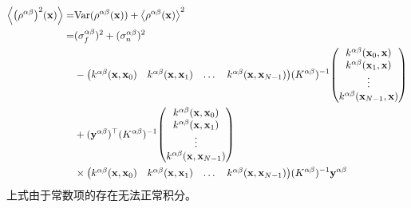 \documentclass[12pt,UTF8]{article}
\begin{document}
            \begin{align}
                \ev{\qty(\rho^{\alpha\beta})^2(\vb{x})}=&\mathrm{Var}(\rho^{\alpha\beta}(\vb{x}))+\ev{\rho^{\alpha\beta}(\vb{x})}^2 \\
                =&(\sigma_f^{\alpha\beta})^2+(\sigma_n^{\alpha\beta})^2 \nonumber \\
                &-\mqty(k^{\alpha\beta}(\vb{x},\vb{x}_{0}) & k^{\alpha\beta}(\vb{x},\vb{x}_{1}) & \dots & k^{\alpha\beta}(\vb{x},\vb{x}_{N-1}))(K^{\alpha\beta})^{-1}\mqty(k^{\alpha\beta}(\vb{x}_0,\vb{x}) \\ k^{\alpha\beta}(\vb{x}_1,\vb{x}) \\ \vdots \\ k^{\alpha\beta}(\vb{x}_{N-1},\vb{x})) \nonumber \\
                &+(\vb{y}^{\alpha\beta})^\top(K^{\alpha\beta})^{-1}\mqty(k^{\alpha\beta}(\vb{x},\vb{x}_{0}) \\ k^{\alpha\beta}(\vb{x},\vb{x}_{1}) \\ \vdots \\ k^{\alpha\beta}(\vb{x},\vb{x}_{N-1})) \nonumber \\
                &\times\mqty(k^{\alpha\beta}(\vb{x},\vb{x}_{0}) & k^{\alpha\beta}(\vb{x},\vb{x}_{1}) & \dots & k^{\alpha\beta}(\vb{x},\vb{x}_{N-1}))(K^{\alpha\beta})^{-1}\vb{y}^{\alpha\beta}
            \end{align}
            上式由于常数项的存在无法正常积分。\par
\end{document}
